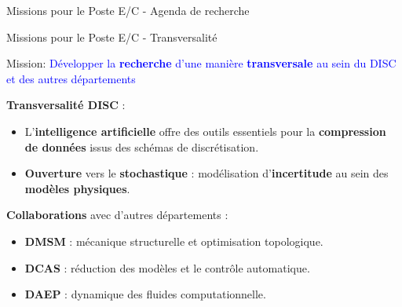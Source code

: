\documentclass[aspectratio=169, french]{beamer}
\begin{document}
\begin{frame}{Missions pour le Poste E/C - Agenda de recherche}
{%
}

\end{frame}


\begin{frame}{Missions pour le Poste E/C - Transversalité}
	\begin{tcolorbox}
		Mission: \textcolor{blue}{Développer la \textbf{recherche} d'une manière \textbf{transversale} au sein du DISC et des autres départements}
	\end{tcolorbox}

	\textbf{Transversalité DISC} : 
	\begin{itemize}
		\item L'\textbf{intelligence artificielle} offre des outils essentiels pour la \textbf{compression de données} issus des schémas de discrétisation.
		\item \textbf{Ouverture} vers le \textbf{stochastique} : modélisation d'\textbf{incertitude} au sein des \textbf{modèles physiques}.
	\end{itemize}
	
	
	\textbf{Collaborations} avec d'autres départements :
	\begin{itemize}
		\item \textbf{DMSM} : mécanique structurelle et optimisation topologique. 
		\item \textbf{DCAS} : réduction des modèles et le contrôle automatique.
		\item \textbf{DAEP} : dynamique des fluides computationnelle.
	\end{itemize}
	
\end{frame}
\end{document}
